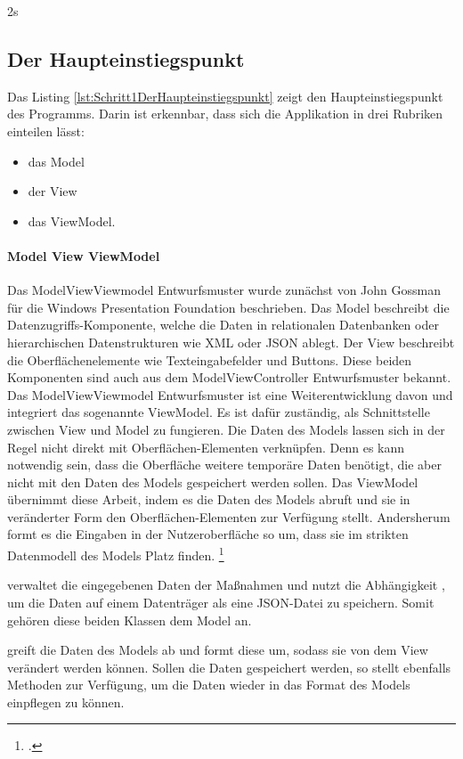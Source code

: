 
\ifIncludeFigure2s \clearpage \fi
\subsection{Der Haupteinstiegspunkt}

Das Listing \ref{lst:Schritt1DerHaupteinstiegspunkt} zeigt den Haupteinstiegspunkt des Programms.
Darin ist erkennbar, dass sich die Applikation in drei Rubriken einteilen lässt:
\begin{itemize}
  \item das Model 
  \item der View 
  \item das ViewModel. 
\end{itemize}
\paragraph{Model View ViewModel}
Das ModelViewViewmodel Entwurfsmuster wurde zunächst von John Gossman für die Windows Presentation Foundation beschrieben.
Das Model beschreibt die Datenzugriffs-Komponente, welche die Daten in relationalen Datenbanken oder hierarchischen Datenstrukturen wie XML oder JSON ablegt.
Der View beschreibt die Oberflächenelemente wie Texteingabefelder und Buttons.
Diese beiden Komponenten sind auch aus dem ModelViewController Entwurfsmuster bekannt.
Das ModelViewViewmodel Entwurfsmuster ist eine Weiterentwicklung davon und integriert das sogenannte ViewModel.
Es ist dafür zuständig, als Schnittstelle zwischen View und Model zu fungieren.
Die Daten des Models lassen sich in der Regel nicht direkt mit Oberflächen-Elementen verknüpfen.
Denn es kann notwendig sein, dass die Oberfläche weitere temporäre Daten benötigt, die aber nicht mit den Daten des Models gespeichert werden sollen.
Das ViewModel übernimmt diese Arbeit, indem es die Daten des Models abruft und sie in veränderter Form den Oberflächen-Elementen zur Verfügung stellt.
Andersherum formt es die Eingaben in der Nutzeroberfläche so um, dass sie im strikten Datenmodell des Models Platz finden.
\footcite[Vgl.][]{IntroductionToModelViewViewModelPatternForBuildingWPFApps}

  verwaltet die eingegebenen Daten der Maßnahmen und nutzt die Abhängigkeit  , um die Daten auf einem Datenträger als eine JSON-Datei zu speichern.
Somit gehören diese beiden Klassen dem Model an.

  greift die Daten des Models ab und formt diese um, sodass sie von dem View   verändert werden können.
Sollen die Daten gespeichert werden, so stellt  ebenfalls Methoden zur Verfügung, um die Daten wieder in das Format des Models einpflegen zu können.

